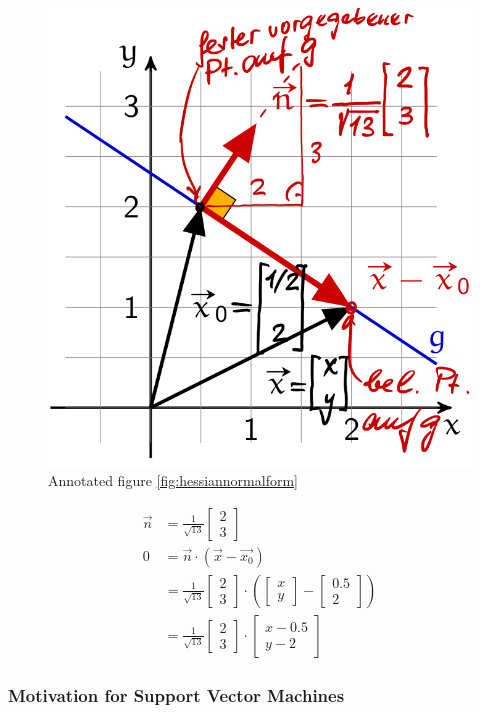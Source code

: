 \documentclass[a4paper, 11pt]{article}
\begin{document}
\begin{figure}[tbh!]
	\centering
	\includegraphics[width=0.5\linewidth, keepaspectratio]{Pictures/hessian_normal_form_example}
	\caption{Annotated figure \ref{fig:hessiannormalform}}
	\label{fig:hessiannormalformexample}
\end{figure}

\begin{align*}
\vec{n} &= \frac{1}{\sqrt{13}} \begin{bmatrix}2\\3\end{bmatrix}\\
0 &= \vec{n}\cdot(\vec{x}-\vec{x_0})\\
&= \frac{1}{\sqrt{13}} \begin{bmatrix}2\\3\end{bmatrix} \cdot(\begin{bmatrix}x\\y\end{bmatrix} - \begin{bmatrix}0.5\\2\end{bmatrix})\\
&= \frac{1}{\sqrt{13}} \begin{bmatrix}2\\3\end{bmatrix} \cdot \begin{bmatrix}x - 0.5\\ y - 2\end{bmatrix}
\end{align*}

\subsubsection{Motivation for Support Vector Machines}
\end{document}
